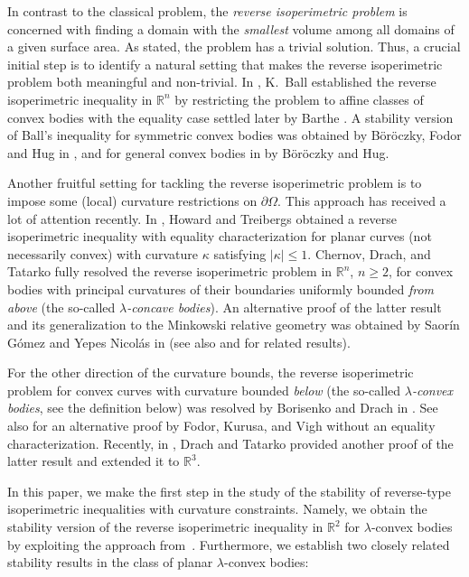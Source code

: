 \documentclass[11pt, oneside]{amsart}
\newcommand{\R}{\mathbb{R}}
\renewcommand{\ge}{\geqslant}
\renewcommand{\le}{\leqslant}
\theoremstyle{theorem}
\theoremstyle{Intro}
\theoremstyle{definition}
\theoremstyle{remark}
\theoremstyle{claim}
\numberwithin{equation}{section}
\begin{document}
 


In contrast to the classical problem, the \emph{reverse isoperimetric problem} is concerned with finding a domain with the \emph{smallest} volume among all domains of a given surface area. As stated, the problem has a trivial solution. Thus, a crucial initial step is to identify a natural setting that makes the reverse isoperimetric problem both meaningful and non-trivial. In \cite{Bal, Bal2}, K.~Ball established the reverse isoperimetric inequality in $\mathbb{R}^n$ by restricting the problem to affine classes of convex bodies with the equality case settled later by Barthe \cite{Bar}. A stability version of Ball's inequality for symmetric convex bodies was obtained by B\"or\"oczky, Fodor and Hug in \cite{BFH}, and for general convex bodies in \cite{BH} by B\"or\"oczky and Hug.


Another fruitful setting for tackling the reverse isoperimetric problem is to impose some (local) curvature restrictions on $\partial \Omega$. This approach has received a lot of attention recently. In \cite{HTr}, Howard and Treibergs obtained a reverse isoperimetric inequality with equality characterization for planar curves (not necessarily convex) with curvature $\kappa$ satisfying $|\kappa| \le 1$. 
Chernov, Drach, and Tatarko \cite{CDT} fully resolved the reverse isoperimetric problem in $\R^n$, $n \ge 2$, for convex bodies with principal curvatures of their boundaries uniformly bounded \emph{from above} (the so-called \emph{$\lambda$-concave bodies}). An alternative proof of the latter result and its generalization to the Minkowski relative geometry was obtained by  Saor\'in G\'omez and Yepes Nicol\'as in \cite{SY} (see also \cite{Piotr} and \cite{Jog} for related results).

For the other direction of the curvature bounds, the reverse isoperimetric problem for convex curves with curvature bounded \emph{below} (the so-called \emph{$\lambda$-convex bodies}, see the definition below) was resolved by Borisenko and Drach in \cite{BorDr14}. See also \cite{FKV} for an alternative proof by Fodor, Kurusa, and Vigh without an equality characterization. Recently, in \cite{DrTa}, Drach and Tatarko provided another proof of the latter result and extended it to $\R^3$.



In this paper, we make the first step in the study of the stability of reverse-type isoperimetric inequalities with curvature constraints. Namely, we obtain the stability version of the reverse isoperimetric inequality in $\R^2$ for $\lambda$-convex bodies by exploiting the approach from~\cite{DrTa}. Furthermore, we establish two closely related stability results in the class of planar $\lambda$-convex bodies:
\end{document}
